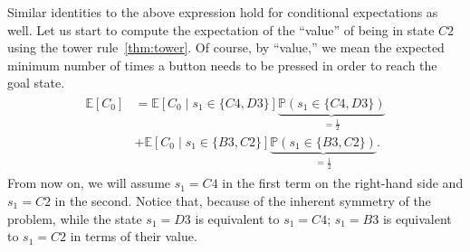 %
Similar identities to the above expression hold for conditional expectations as
well. Let us start to compute the expectation of the ``value'' of being in state $C2$ using the tower rule~\ref{thm:tower}. Of course, by ``value,'' we 
mean the expected minimum number of times a button needs to be pressed in order 
to reach the goal state.
\begin{align}
   \begin{split}
    \mathbb{E}[C_0] &= \mathbb{E}\left[ C_0 \mid s_1 \in \{C4, D3\} \right] 
    \underbrace{\mathbb{P}(s_1 \in \{C4, D3\})}_{=\frac{1}{2}} \\ 
    &+
    \mathbb{E}\left[ C_0 \mid s_1 \in \{B3, C2\} 
    \right] \underbrace{\mathbb{P}(s_1 \in \{B3, C2\})}_{=\frac{1}{2}}.
    \end{split}
    \label{eq:tower1}
\end{align}
%
From now on, we will assume $s_1 = C4$ in the first term on the right-hand side
and $s_1 = C2$ in the second. Notice that, because of the inherent symmetry of
the problem, while the state $s_1 = D3$ is equivalent to $s_1 = C4$; $s_1 =
B3$ is equivalent to $s_1 = C2$ in terms of their value.

